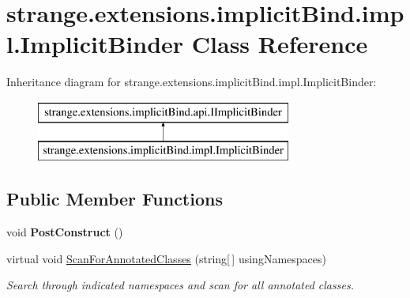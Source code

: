 \hypertarget{classstrange_1_1extensions_1_1implicit_bind_1_1impl_1_1_implicit_binder}{\section{strange.\-extensions.\-implicit\-Bind.\-impl.\-Implicit\-Binder Class Reference}
\label{classstrange_1_1extensions_1_1implicit_bind_1_1impl_1_1_implicit_binder}
}
Inheritance diagram for strange.\-extensions.\-implicit\-Bind.\-impl.\-Implicit\-Binder\-:\begin{figure}[H]
\begin{center}
\leavevmode
\includegraphics[height=2.000000cm]{classstrange_1_1extensions_1_1implicit_bind_1_1impl_1_1_implicit_binder}
\end{center}
\end{figure}
\subsection*{Public Member Functions}
\begin{DoxyCompactItemize}
\item 
\hypertarget{classstrange_1_1extensions_1_1implicit_bind_1_1impl_1_1_implicit_binder_a34f93f17923f2349748b245600f15964}{void {\bfseries Post\-Construct} ()}\label{classstrange_1_1extensions_1_1implicit_bind_1_1impl_1_1_implicit_binder_a34f93f17923f2349748b245600f15964}

\item 
virtual void \hyperlink{classstrange_1_1extensions_1_1implicit_bind_1_1impl_1_1_implicit_binder_a6960a589492d6ad4487ff241f098f952}{Scan\-For\-Annotated\-Classes} (string\mbox{[}$\,$\mbox{]} using\-Namespaces)
\begin{DoxyCompactList}\small\item\em Search through indicated namespaces and scan for all annotated classes. \end{DoxyCompactList}\end{DoxyCompactItemize}
